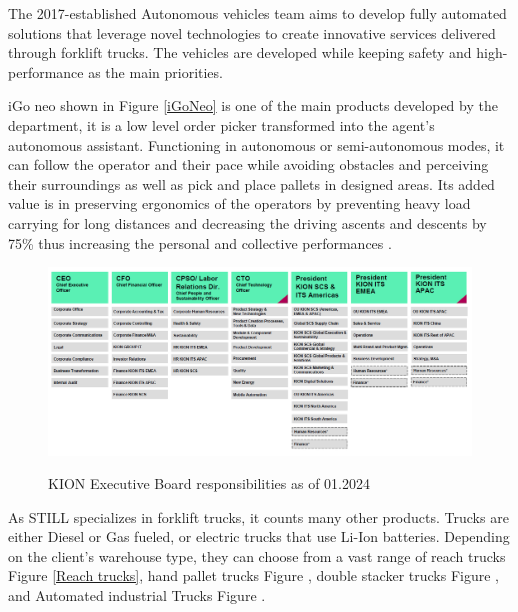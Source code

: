 The 2017-established Autonomous vehicles team aims to develop fully automated solutions that leverage 
novel technologies to create innovative services delivered through forklift trucks. 
The vehicles are developed while keeping safety and high-performance as the main priorities.  

iGo neo shown in Figure \ref{iGoNeo} is one of the main products developed by the department, it is a low level order picker transformed 
into the agent's autonomous assistant. Functioning in autonomous or semi-autonomous modes, it can follow 
the operator and their pace while avoiding obstacles and perceiving their surroundings as well as pick 
and place pallets in designed areas. Its added value is in preserving ergonomics of the operators by 
preventing heavy load carrying for long distances and decreasing the driving ascents and descents by 75\% 
thus increasing the personal and collective performances \cite{R3}.

\begin{figure}[H]
    \begin{center}
    \includegraphics[width=\linewidth]{images/Chap0/KION_Hierarchy.png}\\
    \caption{KION Executive Board responsibilities as of 01.2024 \cite{R2}}
    \label{KION Hierarchy}
    \end{center}
    \end{figure}

As STILL specializes in forklift trucks, it counts many other products. Trucks are either Diesel or 
Gas fueled, or electric trucks that use Li-Ion batteries. Depending on the client's warehouse type, they can
choose from a vast range of reach trucks Figure \ref{Reach trucks}, hand pallet trucks Figure , 
double stacker trucks Figure , and Automated industrial Trucks Figure  \cite{R4}.


